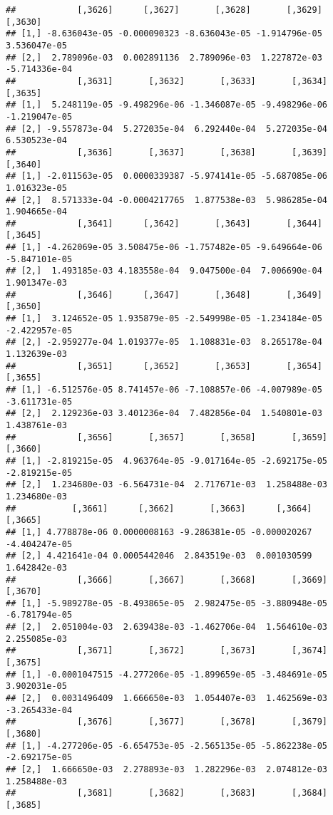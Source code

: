 \documentclass[
]{article}
\begin{document}
\begin{verbatim}
##            [,3626]      [,3627]       [,3628]       [,3629]       [,3630]
## [1,] -8.636043e-05 -0.000090323 -8.636043e-05 -1.914796e-05  3.536047e-05
## [2,]  2.789096e-03  0.002891136  2.789096e-03  1.227872e-03 -5.714336e-04
##            [,3631]       [,3632]       [,3633]       [,3634]       [,3635]
## [1,]  5.248119e-05 -9.498296e-06 -1.346087e-05 -9.498296e-06 -1.219047e-05
## [2,] -9.557873e-04  5.272035e-04  6.292440e-04  5.272035e-04  6.530523e-04
##            [,3636]       [,3637]       [,3638]       [,3639]      [,3640]
## [1,] -2.011563e-05  0.0000339387 -5.974141e-05 -5.687085e-06 1.016323e-05
## [2,]  8.571333e-04 -0.0004217765  1.877538e-03  5.986285e-04 1.904665e-04
##            [,3641]      [,3642]       [,3643]       [,3644]       [,3645]
## [1,] -4.262069e-05 3.508475e-06 -1.757482e-05 -9.649664e-06 -5.847101e-05
## [2,]  1.493185e-03 4.183558e-04  9.047500e-04  7.006690e-04  1.901347e-03
##            [,3646]      [,3647]       [,3648]       [,3649]       [,3650]
## [1,]  3.124652e-05 1.935879e-05 -2.549998e-05 -1.234184e-05 -2.422957e-05
## [2,] -2.959277e-04 1.019377e-05  1.108831e-03  8.265178e-04  1.132639e-03
##            [,3651]      [,3652]       [,3653]       [,3654]       [,3655]
## [1,] -6.512576e-05 8.741457e-06 -7.108857e-06 -4.007989e-05 -3.611731e-05
## [2,]  2.129236e-03 3.401236e-04  7.482856e-04  1.540801e-03  1.438761e-03
##            [,3656]       [,3657]       [,3658]       [,3659]       [,3660]
## [1,] -2.819215e-05  4.963764e-05 -9.017164e-05 -2.692175e-05 -2.819215e-05
## [2,]  1.234680e-03 -6.564731e-04  2.717671e-03  1.258488e-03  1.234680e-03
##           [,3661]      [,3662]       [,3663]      [,3664]       [,3665]
## [1,] 4.778878e-06 0.0000008163 -9.286381e-05 -0.000020267 -4.404247e-05
## [2,] 4.421641e-04 0.0005442046  2.843519e-03  0.001030599  1.642842e-03
##            [,3666]       [,3667]       [,3668]       [,3669]       [,3670]
## [1,] -5.989278e-05 -8.493865e-05  2.982475e-05 -3.880948e-05 -6.781794e-05
## [2,]  2.051004e-03  2.639438e-03 -1.462706e-04  1.564610e-03  2.255085e-03
##            [,3671]       [,3672]       [,3673]       [,3674]       [,3675]
## [1,] -0.0001047515 -4.277206e-05 -1.899659e-05 -3.484691e-05  3.902031e-05
## [2,]  0.0031496409  1.666650e-03  1.054407e-03  1.462569e-03 -3.265433e-04
##            [,3676]       [,3677]       [,3678]       [,3679]       [,3680]
## [1,] -4.277206e-05 -6.654753e-05 -2.565135e-05 -5.862238e-05 -2.692175e-05
## [2,]  1.666650e-03  2.278893e-03  1.282296e-03  2.074812e-03  1.258488e-03
##            [,3681]       [,3682]       [,3683]       [,3684]       [,3685]

\end{verbatim}
\end{document}

